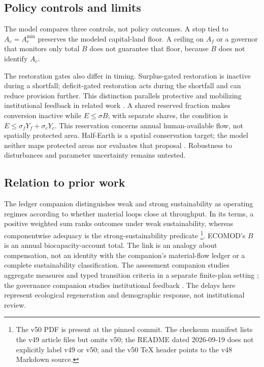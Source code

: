\documentclass[preprint,12pt,authoryear]{elsarticle}
\newcommand{\Acmin}{A_c^{\min}}
\begin{document}
\subsection{Policy controls and limits}

The model compares three controls, not policy outcomes. A stop tied to $A_c=\Acmin$ preserves the modeled capital-land floor. A ceiling on $A_f$ or a governor that monitors only total $B$ does not guarantee that floor, because $B$ does not identify $A_c$.

The restoration gates also differ in timing. Surplus-gated restoration is inactive during a shortfall; deficit-gated restoration acts during the shortfall and can reduce provision further. This distinction parallels protective and mobilizing institutional feedback in related work \citep{Abaee2026a}. A shared reserved fraction makes conversion inactive while $E\le\sigma B$; with separate shares, the condition is $E\le\sigma_fY_f+\sigma_cY_c$. This reservation concerns annual human-available flow, not spatially protected area. Half-Earth is a spatial conservation target; the model neither maps protected areas nor evaluates that proposal \citep{Wilson2016}. Robustness to disturbances and parameter uncertainty remains untested.

\subsection{Relation to prior work}

The ledger companion distinguishes weak and strong sustainability as operating regimes according to whether material loops close at throughput. In its terms, a positive weighted sum ranks outcomes under weak sustainability, whereas componentwise adequacy is the strong-sustainability predicate \citep[Sections~1.1 and 10.1]{Abaee2026c}\footnote{The v50 PDF is present at the pinned commit. The checksum manifest lists the v49 article files but omits v50; the README dated 2026-09-19 does not explicitly label v49 or v50; and the v50 TeX header points to the v48 Markdown source.}. ECOMOD's $B$ is an annual biocapacity-account total. The link is an analogy about compensation, not an identity with the companion's material-flow ledger or a complete sustainability classification. The assessment companion studies aggregate measures and typed transition criteria in a separate finite-plan setting \citep{Abaee2026b}; the governance companion studies institutional feedback \citep{Abaee2026a}. The delays here represent ecological regeneration and demographic response, not institutional review.
\end{document}
